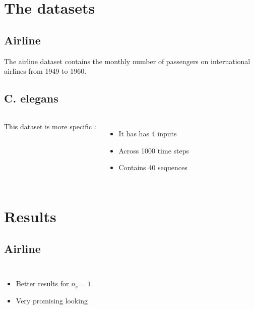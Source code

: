 \documentclass[14pt]{beamer}
\begin{document}
\section{The datasets}
\subsection{Airline}
\begin{frame}{\insertsection}{\insertsubsection}
  The airline dataset contains the monthly number of passengers on international airlines from 1949 to 1960.
  
\end{frame}

\subsection{C. elegans}
\begin{frame}{\insertsection}{\insertsubsection}
  \begin{columns}
    This dataset is more specific :
    \begin{itemize}
      \item It has has 4 inputs
      \item Across 1000 time steps
      \item Contains 40 sequences
    \end{itemize}
    
  \end{columns}
\end{frame}

\section{Results}
\subsection{Airline}
\begin{frame}{\insertsection}{\insertsubsection}
  \begin{columns}
    
    \begin{itemize}
      \item Better results for $n_s=1$
      \item Very promising looking
    \end{itemize}
  \end{columns}
\end{frame}
\end{document}
